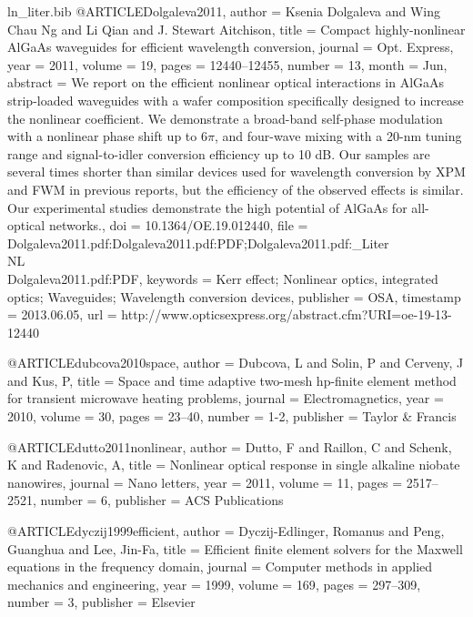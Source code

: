 \begin{filecontents*}{ln_liter.bib}
@ARTICLE{Dolgaleva2011,
  author = {Ksenia Dolgaleva and Wing Chau Ng and Li Qian and J. Stewart Aitchison},
  title = {Compact highly-nonlinear AlGaAs waveguides for efficient wavelength
	conversion},
  journal = {Opt. Express},
  year = {2011},
  volume = {19},
  pages = {12440--12455},
  number = {13},
  month = {Jun},
  abstract = {We report on the efficient nonlinear optical interactions in AlGaAs
	strip-loaded waveguides with a wafer composition specifically designed
	to increase the nonlinear coefficient. We demonstrate a broad-band
	self-phase modulation with a nonlinear phase shift up to 6$\pi$,
	and four-wave mixing with a 20-nm tuning range and signal-to-idler
	conversion efficiency up to 10 dB. Our samples are several times
	shorter than similar devices used for wavelength conversion by XPM
	and FWM in previous reports, but the efficiency of the observed effects
	is similar. Our experimental studies demonstrate the high potential
	of AlGaAs for all-optical networks.},
  doi = {10.1364/OE.19.012440},
  file = {Dolgaleva2011.pdf:Dolgaleva2011.pdf:PDF;Dolgaleva2011.pdf:_Liter\\NL\\Dolgaleva2011.pdf:PDF},
  keywords = {Kerr effect; Nonlinear optics, integrated optics; Waveguides; Wavelength
	conversion devices},
  publisher = {OSA},
  timestamp = {2013.06.05},
  url = {http://www.opticsexpress.org/abstract.cfm?URI=oe-19-13-12440}
}

@ARTICLE{dubcova2010space,
  author = {Dubcova, L and Solin, P and Cerveny, J and Kus, P},
  title = {Space and time adaptive two-mesh hp-finite element method for transient
	microwave heating problems},
  journal = {Electromagnetics},
  year = {2010},
  volume = {30},
  pages = {23--40},
  number = {1-2},
  publisher = {Taylor \& Francis}
}

@ARTICLE{dutto2011nonlinear,
  author = {Dutto, F and Raillon, C and Schenk, K and Radenovic, A},
  title = {Nonlinear optical response in single alkaline niobate nanowires},
  journal = {Nano letters},
  year = {2011},
  volume = {11},
  pages = {2517--2521},
  number = {6},
  publisher = {ACS Publications}
}

@ARTICLE{dyczij1999efficient,
  author = {Dyczij-Edlinger, Romanus and Peng, Guanghua and Lee, Jin-Fa},
  title = {Efficient finite element solvers for the {M}axwell equations in the
	frequency domain},
  journal = {Computer methods in applied mechanics and engineering},
  year = {1999},
  volume = {169},
  pages = {297--309},
  number = {3},
  publisher = {Elsevier}
}


\end{filecontents*}
